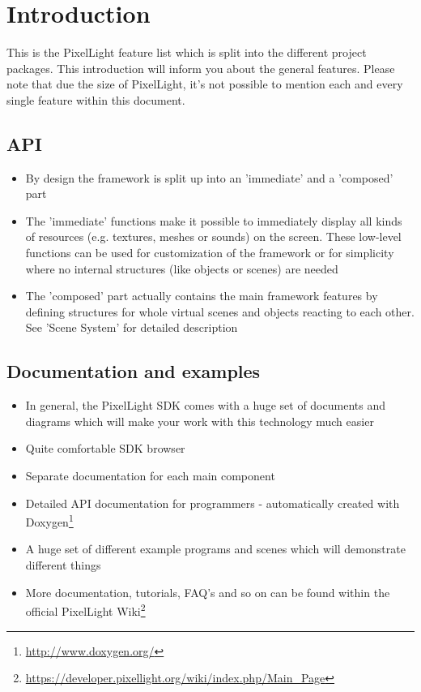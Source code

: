 \chapter{Introduction}
This is the PixelLight feature list which is split into the different project packages. This introduction will inform you about the general features. Please note that due the size of PixelLight, it's not possible to mention each and every single feature within this document.





\section{API}
\begin{itemize}
\item{By design the framework is split up into an 'immediate' and a 'composed' part}
\item{The 'immediate' functions make it possible to immediately display all kinds of resources (e.g. textures, meshes or sounds) on the screen. These low-level functions can be used for customization of the framework or for simplicity where no internal structures (like objects or scenes) are needed}
\item{The 'composed' part actually contains the main framework features by defining structures for whole virtual scenes and objects reacting to each other. See 'Scene System' for detailed description}
\end{itemize}





\section{Documentation and examples}
\begin{itemize}
\item{In general, the PixelLight SDK comes with a huge set of documents and diagrams which will make your work with this technology much easier}
\item{Quite comfortable SDK browser}
\item{Separate documentation for each main component}
\item{Detailed API documentation for programmers - automatically created with Doxygen\footnote{\url{http://www.doxygen.org/}}}
\item{A huge set of different example programs and scenes which will demonstrate different things}
\item{More documentation, tutorials, FAQ's and so on can be found within the official PixelLight Wiki\footnote{\url{https://developer.pixellight.org/wiki/index.php/Main_Page}}}
\end{itemize}





